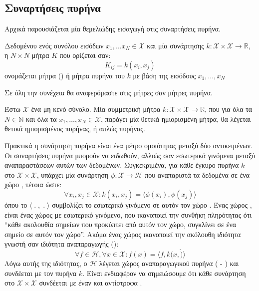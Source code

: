 \subsection{Συναρτήσεις πυρήνα}
Αρχικά παρουσιάζεται μία θεμελιώδης εισαγωγή στις συναρτήσεις πυρήνα.
\begin{definition}
Δεδομένου ενός συνόλου εισόδων $x_{1}, \dots x_{N} \in \mathcal{X}$ και μία συνάρτησης $k:\mathcal{X}\times\mathcal{X}\rightarrow \mathbb{R}$, η $N \times N$ μήτρα $K$ που ορίζεται σαν:
$$K_{ij} = k(x_{i}, x_{j}) $$
ονομάζεται  μήτρα () ή μήτρα πυρήνα του $k$ με βάση της εισόδους $x_{1}, \dots, x_{N}$
\label{def:kernel_matrix}
\end{definition}
Σε όλη την συνέχεια θα αναφερόμαστε στις μήτρες  σαν μήτρες πυρήνα.
\begin{definition}
Έστω $\mathcal{X}$ ένα μη κενό σύνολο.
Μία συμμετρική μήτρα $k:\mathcal{X} \times \mathcal{X} \rightarrow \mathbb{R}$, που για όλα τα $N \in \mathbb{N}$ και όλα τα $x_{1},\dots, x_{N} \in \mathcal{X}$, παράγει μία θετικά ημιορισμένη μήτρα, θα λέγεται θετικά ημιορισμένος πυρήνας, ή απλώς πυρήνας.
\label{def:psd_km}
\end{definition}
Πρακτικά η συνάρτηση πυρήνα είναι ένα μέτρο ομοιότητας μεταξύ δύο αντικειμένων.
Οι συναρτήσεις πυρήνα μπορούν να ειδωθούν, αλλιώς σαν εσωτερικά γινόμενα μεταξύ αναπαραστάσεων αυτών των δεδομένων.
Συγκεκριμένα, για κάθε έγκυρο πυρήνα $k$ στο $\mathcal{X}\times\mathcal{X}$, υπάρχει μία συνάρτηση $\phi: \mathcal{X} \rightarrow \mathcal{H}$ που αναπαριστά τα δεδομένα σε ένα χώρο , τέτοια ώστε:
\begin{equation}
\forall x_{i}, x_{j} \in \mathcal{X}: k(x_{i}, x_{j}) = \langle \phi(x_{i}), \phi(x_{j}) \rangle
\end{equation}
όπου το $\langle\;.\;,\;.\;\rangle$ συμβολίζει το εσωτερικό γινόμενο σε αυτόν τον χώρο .
Ένας χώρος , είναι ένας χώρος με εσωτερικό γινόμενο, που ικανοποιεί την συνθήκη πληρότητας ότι ``κάθε ακολουθία σημείων  που προκύπτει από αυτόν τον χώρο, συγκλίνει σε ένα σημείο σε αυτόν τον χώρο''. Ακόμα ένας χώρος  ικανοποιεί την ακόλουθη ιδιότητα γνωστή σαν ιδιότητα αναπαραγωγής ():
\begin{equation}
\forall f \in \mathcal{H}, \forall x \in \mathcal{X}: f(x)=\langle f, k(x,\dot)\rangle
\end{equation}
Λόγω αυτής της ιδιότητας, ο $\mathcal{H}$ λέγεται χώρος  αναπαραγωγικού πυρήνα ( - ) και συνδέεται με τον πυρήνα $k$.
Είναι ενδιαφέρον να σημειώσουμε ότι κάθε συνάρτηση στο $\mathcal{X} \times \mathcal{X}$ συνδέεται με έναν  και αντίστροφα \cite{Aronszajn1950}.

